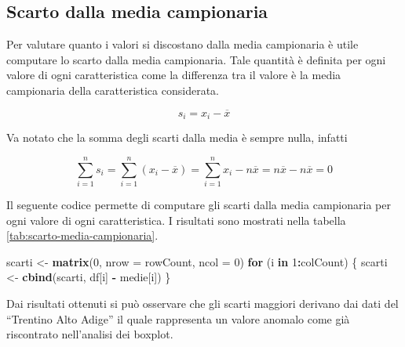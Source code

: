 \documentclass[]{book}
\newenvironment{Shaded}{\begin{snugshade}}{\end{snugshade}}
\newcommand{\KeywordTok}[1]{\textcolor[rgb]{0.13,0.29,0.53}{\textbf{#1}}}
\newcommand{\DataTypeTok}[1]{\textcolor[rgb]{0.13,0.29,0.53}{#1}}
\newcommand{\DecValTok}[1]{\textcolor[rgb]{0.00,0.00,0.81}{#1}}
\newcommand{\StringTok}[1]{\textcolor[rgb]{0.31,0.60,0.02}{#1}}
\newcommand{\ControlFlowTok}[1]{\textcolor[rgb]{0.13,0.29,0.53}{\textbf{#1}}}
\newcommand{\OperatorTok}[1]{\textcolor[rgb]{0.81,0.36,0.00}{\textbf{#1}}}
\newcommand{\NormalTok}[1]{#1}
\begin{document}
\subsection{Scarto dalla media
campionaria}\label{scarto-dalla-media-campionaria}

Per valutare quanto i valori si discostano dalla media campionaria è
utile computare lo scarto dalla media campionaria. Tale quantità è
definita per ogni valore di ogni caratteristica come la differenza tra
il valore è la media campionaria della caratteristica considerata.

\[s_i = x_i - \overline{x}\]

Va notato che la somma degli scarti dalla media è sempre nulla, infatti

\[\sum_{i=1}^{n}s_i = \sum_{i=1}^{n}(x_i - \overline{x}) = \sum_{i=1}^{n} x_i - n\overline{x} = n\overline{x} - n\overline{x} = 0\]

Il seguente codice permette di computare gli scarti dalla media
campionaria per ogni valore di ogni caratteristica. I risultati sono
mostrati nella tabella \ref{tab:scarto-media-campionaria}.

\begin{Shaded}
\begin{Highlighting}[]
\NormalTok{scarti <-}\StringTok{ }\KeywordTok{matrix}\NormalTok{(}\DecValTok{0}\NormalTok{, }\DataTypeTok{nrow =}\NormalTok{ rowCount, }\DataTypeTok{ncol =} \DecValTok{0}\NormalTok{)}
\ControlFlowTok{for}\NormalTok{ (i }\ControlFlowTok{in} \DecValTok{1}\OperatorTok{:}\NormalTok{colCount) \{ }
\NormalTok{  scarti <-}\StringTok{ }\KeywordTok{cbind}\NormalTok{(scarti, df[i] }\OperatorTok{-}\StringTok{ }\NormalTok{medie[i])}
\NormalTok{\}}
\end{Highlighting}
\end{Shaded}

Dai risultati ottenuti si può osservare che gli scarti maggiori derivano
dai dati del ``Trentino Alto Adige'' il quale rappresenta un valore
anomalo come già riscontrato nell'analisi dei boxplot.
\end{document}
